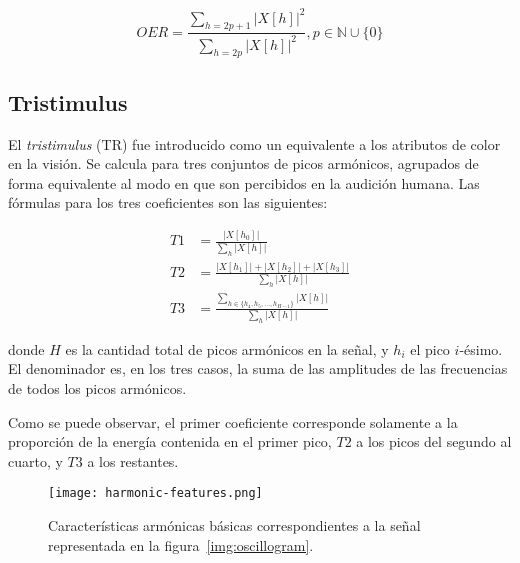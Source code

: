 \begin{equation}
    OER = \frac{\sum_{h=2p+1}{|X[h]|^2}}{\sum_{h=2p}{|X[h]|^2}}, p\in\mathbb{N}\cup \{ 0 \}
\end{equation}

\subsection{Tristimulus}\label{subsec:tristimulus}

El \textit{tristimulus} (TR) fue introducido como un equivalente a los atributos de color en la visión.
Se calcula para tres conjuntos de picos armónicos, agrupados de forma equivalente al modo en que son percibidos en la audición humana.
Las fórmulas para los tres coeficientes son las siguientes:

\begin{equation}
    \begin{aligned}
        T1 & = \frac{|X[h_0]|}{\sum_{h}{|X[h]|}} \\
        T2 & = \frac{|X[h_1]|+|X[h_2]|+|X[h_3]|}{\sum_{h}{|X[h]|}} \\
        T3 & = \frac{\sum_{h\in \{h_4, h_5, \ldots, h_{H-1}\}}{|X[h]|}}{\sum_{h}{|X[h]|}}
    \end{aligned}
\end{equation}

\noindent
donde $H$ es la cantidad total de picos armónicos en la señal, y $h_i$ el pico $i$-ésimo.
El denominador es, en los tres casos, la suma de las amplitudes de las frecuencias de todos los picos armónicos.

Como se puede observar, el primer coeficiente corresponde solamente a la proporción de la energía contenida en el primer pico, $T2$ a los picos del segundo al cuarto, y $T3$ a los restantes.

\begin{figure}[!h]
    \centering
    \texttt{[image: harmonic-features.png]}
    \caption{Características armónicas básicas correspondientes a la señal representada en la figura~\ref{img:oscillogram}.}
    \label{img:harmonic-features}
\end{figure}

